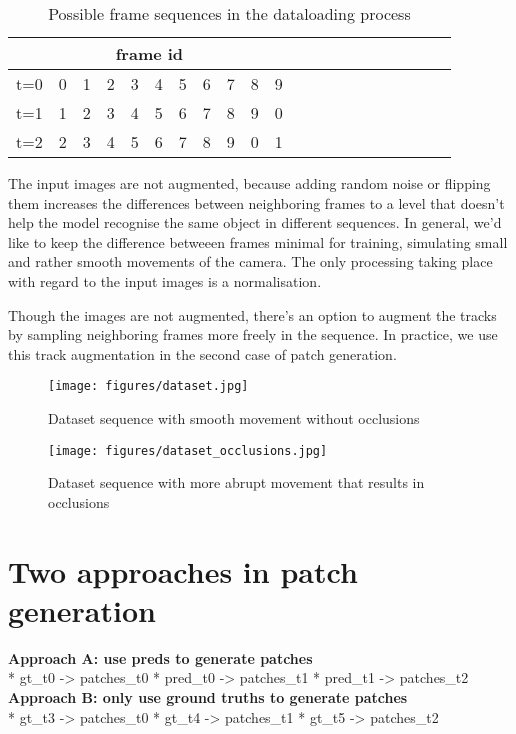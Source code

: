 \begin{table}[htpb]
  \caption[Dataloading explained]{Possible frame sequences in the dataloading process}\label{tab:dataloading}
  \centering
  \begin{tabular}{ |p{0.6cm}|p{0.2cm}|p{0.2cm}|p{0.2cm}|p{0.2cm}|p{0.2cm}|p{0.2cm}|p{0.2cm}|p{0.2cm}|p{0.2cm}|p{0.2cm}|p{0.2cm}|p{0.2cm}|p{0.2cm}|p{0.2cm}|p{0.2cm}|p{0.2cm}|p{0.2cm}|p{0.2cm}|p{0.2cm}|p{0.2cm}| }
 \hline
 \multicolumn{11}{|c|}{frame id} \\
 \hline
   t=0 & 0 & 1 & 2 & 3 & 4 & 5 & 6 & 7 & 8 & 9\\
 \hline
  t=1 & 1 & 2 & 3 & 4 & 5 & 6 & 7 & 8 & 9 & 0\\
  \hline
  t=2 & 2 & 3 & 4 & 5 & 6 & 7 & 8 & 9 & 0 & 1\\
 \hline

\end{tabular}
\end{table}


The input images are not augmented, because adding random noise or flipping them increases the differences between neighboring frames to a level that doesn't help the model recognise the same object in different sequences. In general, we'd like to keep the difference betweeen frames minimal for training, simulating small and rather smooth movements of the camera. The only processing taking place with regard to the input images is a normalisation.\par
Though the images are not augmented, there's an option to augment the tracks by sampling neighboring frames more freely in the sequence. In practice, we use this track augmentation in the second case of patch generation. \par


\begin{figure}
\caption{Dataset sequence with smooth movement without occlusions}
\centering
\texttt{[image: figures/dataset.jpg]}
\end{figure}

\begin{figure}
\caption{Dataset sequence with more abrupt movement that results in occlusions}
\centering
\texttt{[image: figures/dataset\_occlusions.jpg]}
\end{figure}

\section{Two approaches in patch generation}
\textbf{Approach A: use preds to generate patches}\\
* gt\_t0 -> patches\_t0
* pred\_t0 -> patches\_t1
* pred\_t1 -> patches\_t2
\textbf{Approach B: only use ground truths to generate patches}\\
* gt\_t3 -> patches\_t0
* gt\_t4 -> patches\_t1
* gt\_t5 -> patches\_t2

